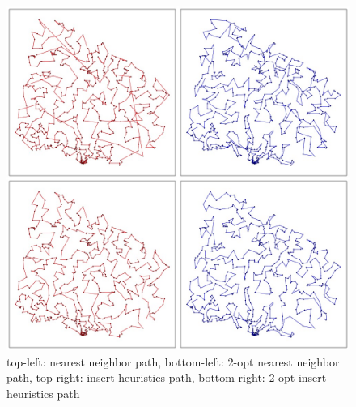 \documentclass[11pt, oneside]{article}   	%
\begin{document}
\begin{figure}[!ht]
\centering
\includegraphics[width=140mm]{images/path-all.jpeg}
\caption{top-left: nearest neighbor path, bottom-left: 2-opt nearest neighbor path, top-right: insert heuristics path, bottom-right: 2-opt insert heuristics path}
\end{figure} 

\newpage

\end{document}
